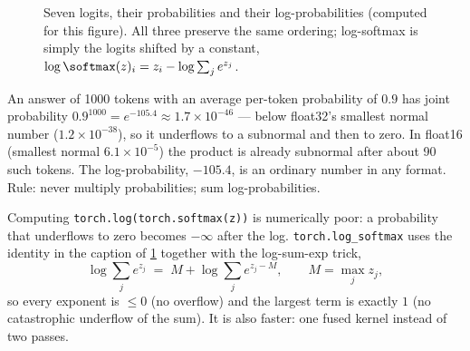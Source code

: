 \begin{figure}[t]
\centering
{}
\caption{Seven logits, their probabilities and their log-probabilities (computed for this figure).
All three preserve the same ordering; log-softmax is simply the logits shifted by a constant,
$\log\softmax(z)_i = z_i - \log\sum_j e^{z_j}$.}
\label{fig:refine:three-views}
\end{figure}

\begin{napkinmath}
An answer of 1000 tokens with an average per-token probability of $0.9$ has joint probability
$0.9^{1000} = e^{-105.4} \approx 1.7\times10^{-46}$ --- below float32's smallest normal number
($1.2\times10^{-38}$), so it underflows to a subnormal and then to zero. In float16 (smallest normal
$6.1\times10^{-5}$) the product is already subnormal after about 90 such tokens. The log-probability,
$-105.4$, is an ordinary number in any format. Rule: never multiply probabilities; sum
log-probabilities.
\end{napkinmath}

Computing \texttt{torch.log(torch.softmax(z))} is numerically poor: a probability that underflows to
zero becomes $-\infty$ after the log. \texttt{torch.log\_softmax} uses the identity in the caption of
\cref{fig:refine:three-views} together with the log-sum-exp trick,
\begin{equation}
  \log \sum_j e^{z_j} \;=\; M + \log \sum_j e^{z_j - M}, \qquad M = \max_j z_j,
  \label{eq:refine:lse}
\end{equation}
so every exponent is $\le 0$ (no overflow) and the largest term is exactly $1$ (no catastrophic
underflow of the sum). It is also faster: one fused kernel instead of two passes.

